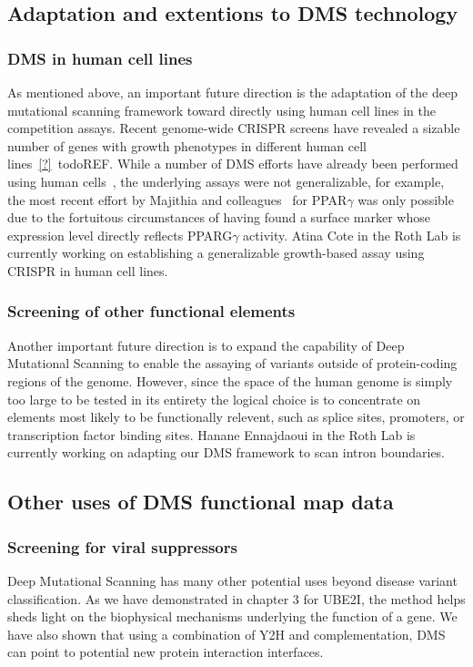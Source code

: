 \subsection{Adaptation and extentions to DMS technology}
\subsubsection{DMS in human cell lines}
As mentioned above, an important future direction is the adaptation of the deep mutational scanning framework toward directly using human cell lines in the competition assays. Recent genome-wide CRISPR screens have revealed a sizable number of genes with growth phenotypes in different human cell lines~\ref{?}~todo{REF}. While a number of DMS efforts have already been performed using human cells~\cite{forsyth_deep_2013,wagenaar_resistance_2014,doud_site-specific_2015,majithia_prospective_2016}, the underlying assays were not generalizable, for example, the most recent effort by Majithia and colleagues~\cite{majithia_prospective_2016} for PPAR$\gamma$ was only possible due to the fortuitous circumstances of having found a surface marker whose expression level directly reflects PPARG$\gamma$ activity. 
Atina Cote in the Roth Lab is currently working on establishing a generalizable growth-based assay using CRISPR in human cell lines. 

\subsubsection{Screening of other functional elements}
Another important future direction is to expand the capability of Deep Mutational Scanning to enable the assaying of variants outside of protein-coding regions of the genome. However, since the space of the human genome is simply too large to be tested in its entirety the logical choice is to concentrate on elements most likely to be functionally relevent, such as splice sites, promoters, or transcription factor binding sites.
Hanane Ennajdaoui in the Roth Lab is currently working on adapting our DMS framework to scan intron boundaries.

\subsection{Other uses of DMS functional map data}

\subsubsection{Screening for viral suppressors}
Deep Mutational Scanning has many other potential uses beyond disease variant classification. As we have demonstrated in chapter 3 for UBE2I, the method helps sheds light on the biophysical mechanisms underlying the function of a gene. We have also shown that using a combination of Y2H and complementation, DMS can point to potential new protein interaction interfaces. 

